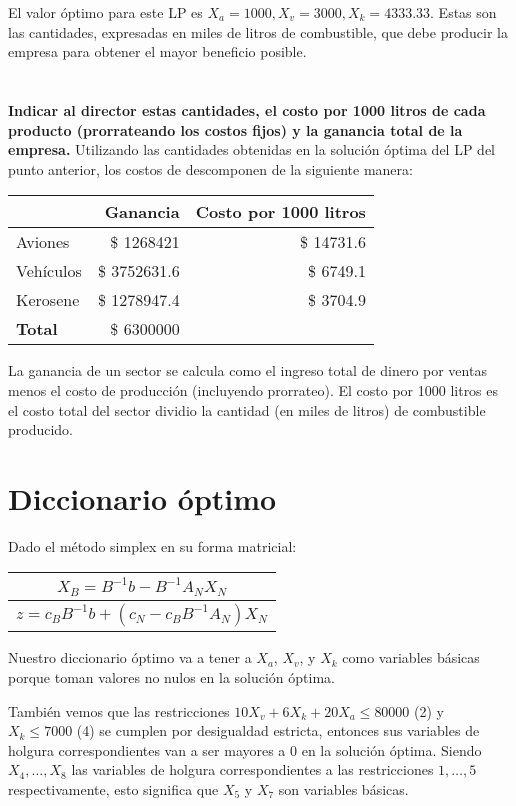 \documentclass[10pt,a4paper]{article}
\begin{document}
El valor óptimo para este LP es $X_a = 1000, X_v = 3000,  X_k = 4333.33$. Estas son las cantidades, expresadas en miles de litros de combustible, que debe producir la empresa para obtener el mayor beneficio posible. 

\section{} %
\textbf{Indicar al director estas cantidades, el costo por 1000 litros de cada producto (prorrateando los costos fijos) y la ganancia total de la empresa.}
Utilizando las cantidades obtenidas en la solución óptima del LP del punto anterior, los costos de descomponen de la siguiente manera:

\begin{table}[h!]
	\centering
	\begin{tabular}{|l|r|r|}
		\hline
		\textbf{} & \textbf{Ganancia} & \textbf{Costo por 1000 litros} \\
		\hline
		Aviones   & \$ 1268421 & \$ 14731.6 \\
		Vehículos & \$ 3752631.6 & \$ 6749.1 \\
		Kerosene  & \$ 1278947.4 & \$ 3704.9 \\
		\hline
		\textbf{Total} &\$ 6300000 & \\
		\hline
	\end{tabular}
\end{table}

La ganancia de un sector se calcula como el ingreso total de dinero por ventas menos el costo de producción (incluyendo prorrateo). El costo por 1000 litros es el costo total del sector dividio la cantidad (en miles de litros) de combustible producido. 

\section*{Diccionario óptimo}

Dado el método simplex en su forma matricial:
\begin{tabular}{c}
	$X_B = B^{-1}b - B^{-1}A_NX_N$ \\
	\hline
	$z = c_B B^{-1} b + (c_N - c_B B^{-1} A_N) X_N$
\end{tabular}

Nuestro diccionario óptimo va a tener a $X_a$, $X_v$, y $X_k$ como variables básicas porque toman valores no nulos en la solución óptima.

También vemos que las restricciones $10 X_v + 6 X_k + 20 X_a \leq 80000$ (2) y $X_k \leq 7000$ (4) se cumplen por desigualdad estricta, entonces sus variables de holgura correspondientes van a ser mayores a 0 en la solución óptima.
Siendo $X_4, \dots, X_8$ las variables de holgura correspondientes a las restricciones $1, \dots, 5$ respectivamente, esto significa que $X_5$ y $X_7$ son variables básicas.
\end{document}

